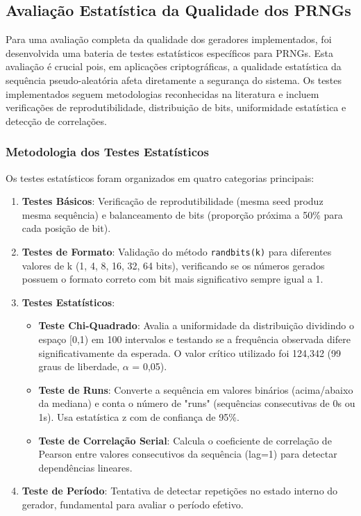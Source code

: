 \documentclass[a4paper, 11pt]{article}
\begin{document}
\subsection{Avaliação Estatística da Qualidade dos PRNGs}

Para uma avaliação completa da qualidade dos geradores implementados, foi desenvolvida
uma bateria de testes estatísticos específicos para PRNGs. Esta avaliação é crucial
pois, em aplicações criptográficas, a qualidade estatística da sequência
pseudo-aleatória afeta diretamente a segurança do sistema. Os testes implementados
seguem metodologias reconhecidas na literatura e incluem verificações de
reprodutibilidade, distribuição de bits, uniformidade estatística e detecção de
correlações.

\subsubsection{Metodologia dos Testes Estatísticos}

Os testes estatísticos foram organizados em quatro categorias principais:

\begin{enumerate}
    \item \textbf{Testes Básicos}: Verificação de reprodutibilidade (mesma seed produz
mesma sequência) e balanceamento de bits (proporção próxima a 50\% para cada posição de
bit).

    \item \textbf{Testes de Formato}: Validação do método \texttt{randbits(k)} para
diferentes valores de k (1, 4, 8, 16, 32, 64 bits), verificando se os números gerados
possuem o formato correto com bit mais significativo sempre igual a 1.

    \item \textbf{Testes Estatísticos}:
    \begin{itemize}
        \item \textbf{Teste Chi-Quadrado}: Avalia a uniformidade da distribuição
dividindo o espaço [0,1) em 100 intervalos e testando se a frequência observada difere
significativamente da esperada. O valor crítico utilizado foi 124,342 (99 graus de
liberdade, $\alpha$ = 0,05).
        \item \textbf{Teste de Runs}: Converte a sequência em valores binários
(acima/abaixo da mediana) e conta o número de "runs" (sequências consecutivas de 0s ou
1s). Usa estatística z com de confiança de 95\%.
        \item \textbf{Teste de Correlação Serial}: Calcula o coeficiente de correlação
de Pearson entre valores consecutivos da sequência (lag=1) para detectar dependências
lineares.
    \end{itemize}

    \item \textbf{Teste de Período}: Tentativa de detectar repetições no estado interno
do gerador, fundamental para avaliar o período efetivo.
\end{enumerate}
\end{document}
